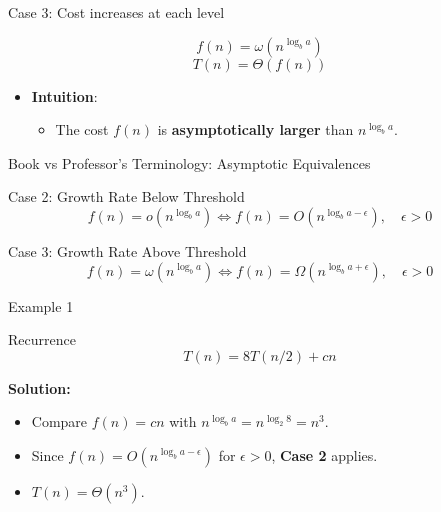\documentclass[10pt,aspectratio=43]{beamer}
\begin{document}
\begin{frame}{Case 3: Cost increases at each level}

\begin{block}{}
\[
f(n) = \omega(n^{\log_b a})
\]
\[
T(n) = \Theta(f(n))
\]
\end{block}

\begin{itemize}
    \item \textbf{Intuition}:
    \begin{itemize}
        \item The cost \( f(n) \) is \textbf{asymptotically larger} than \( n^{\log_b a} \).

    \end{itemize}
\end{itemize}

\end{frame}
\begin{frame}{Book vs Professor's Terminology: Asymptotic Equivalences}

  \begin{block}{Case 2: Growth Rate Below Threshold}
    \[
    f(n) = o(n^{\log_b a}) \iff f(n) = O(n^{\log_b{a-\epsilon}}), \quad \epsilon > 0
    \]
  \end{block}

  \vspace{0.5cm}

  \begin{block}{Case 3: Growth Rate Above Threshold}
    \[
    f(n) = \omega(n^{\log_b a}) \iff f(n) = \Omega(n^{\log_b{a+\epsilon}}), \quad \epsilon > 0
    \]
  \end{block}

\end{frame}


\begin{frame}{Example 1}
  \begin{block}{Recurrence}
\[
T(n) = 8T(n/2) + cn
\]
  \end{block}

\textbf{Solution:}
\begin{itemize}
    \item Compare \( f(n) = cn \) with \( n^{\log_b a} = n^{\log_2 8} = n^3 \).
    \item Since \( f(n) = O(n^{\log_b a - \epsilon}) \) for \( \epsilon > 0 \), \textbf{Case 2} applies.
    \item \( T(n) = \Theta(n^3) \).
\end{itemize}
\end{frame}
\end{document}
